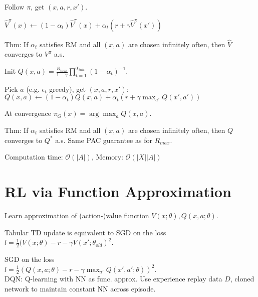  Follow $\pi$, get $(x,a,r,x')$. 

{$\hat{V}^\pi(x) \leftarrow (1 - \alpha_t) \hat{V}^\pi(x) + \alpha_t (r + \gamma \hat{V}^\pi(x'))$}

Thm: If $\alpha_t$ satisfies RM and all $(x,a)$ are chosen
infinitely often, then $\hat{V}$ converges to $V^\pi$ a.s.


Init ${Q(x,a) = \frac{R_{max}}{1 - \gamma} \prod_{t=1}^{T_{init}} (1 - \alpha_t)^{-1}}$.

Pick $a$ (e.g. $\epsilon_t$ greedy), get $(x,a,r,x')$: 
{$Q(x,a) \leftarrow (1 - \alpha_t) Q(x,a) + \alpha_t (r + \gamma \max_{a'} Q(x', a'))$}

At convergence $\pi_G(x) = \arg\max_a Q(x,a)$.

Thm: If $\alpha_t$ satisfies RM and all $(x,a)$ are chosen
infinitely often, then $Q$ converges to $Q^*$ a.s. Same PAC guarantee
as for $R_{max}.$

Computation time: $\mathcal{O}(|A|)$, Memory: $\mathcal{O}(|X||A|)$


\section{RL via Function Approximation} 
{Learn approximation of (action-)value function
$V(x; \theta), Q(x,a;\theta)$}.

Tabular TD update is equivalent to SGD on the 
loss 
$l= \frac{1}{2}(V(x;\theta) - r - \gamma V(x'; \theta_{old})^2$. 


SGD on the loss \\$l=\frac{1}{2}(Q(x,a;\theta) -r - \gamma \max_{a'}Q(x',a';\theta))^2$. 
\\%
DQN: Q-learning with NN as func. approx. 
Use experience replay data $D$, cloned network to maintain constant 
NN across episode.

